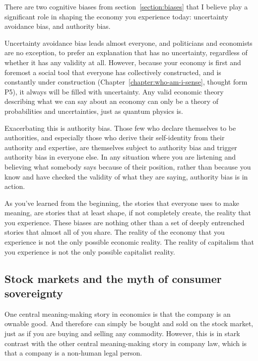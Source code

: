 There are two cognitive biases from section~\ref{section:biases} that I believe play a significant role in shaping the economy you experience today: uncertainty avoidance bias, and authority bias.


Uncertainty avoidance bias leads almost everyone, and politicians and economists are no exception, to prefer an explanation that has no uncertainty, regardless of whether it has any validity at all. However, because your economy is first and foremost a social tool that everyone has collectively constructed, and is constantly under construction (Chapter~\ref{chapter:who-am-i-sense}, thought form P5), it always will be filled with uncertainty. Any valid economic theory describing what we can say about an economy can only be a theory of probabilities and uncertainties, just as quantum physics is.


Exacerbating this is authority bias. Those few who declare themselves to be authorities, and especially those who derive their self-identity from their authority and expertise, are themselves subject to authority bias and trigger authority bias in everyone else. In any situation where you are listening and believing what somebody says because of their position, rather than because you know and have checked the validity of what they are saying, authority bias is in action.


As you've learned from the beginning, the stories that everyone uses to make meaning, are stories that at least shape, if not completely create, the reality that you experience. These biases are nothing other than a set of deeply entrenched stories that almost all of you share. The reality of the economy that you experience is not the only possible economic reality. The reality of capitalism that you experience is not the only possible capitalist reality.
\subsection{Stock markets and the myth of consumer sovereignty} 
 One central meaning\hyp{}making story in economics is that the company is an ownable good. And therefore can simply be bought and sold on the stock market, just as if you are buying and selling any commodity. However, this is in stark contrast with the other central meaning\hyp{}making story in company law, which is that a company is a non-human legal person. 


